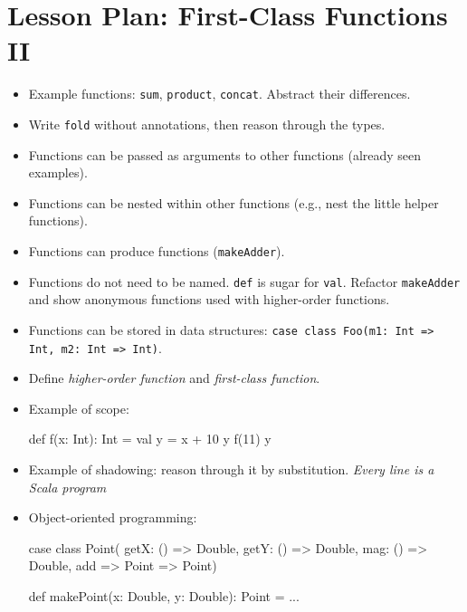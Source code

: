 \documentclass[9pt]{extbook}
\begin{document}
\chapter{Lesson Plan: First-Class Functions II}

\begin{itemize}

\item Example functions: \lstinline|sum|, \lstinline|product|, \lstinline|concat|. Abstract their differences. 

\item Write \lstinline|fold| without annotations, then reason through the types.

\item Functions can be passed as arguments to other functions (already seen examples).

\item Functions can be nested within other functions (e.g., nest the little helper functions).

\item Functions can produce functions (\lstinline|makeAdder|).

\item Functions do not need to be named. \lstinline|def| is sugar for
  \lstinline|val|. Refactor \lstinline|makeAdder| and show anonymous
  functions used with higher-order functions.

\item Functions can be stored in data structures:
  \lstinline|case class Foo(m1: Int => Int, m2: Int => Int)|.

\item Define \emph{higher-order function} and \emph{first-class function}.

\item Example of scope:

  \begin{scalacode}
  def f(x: Int): Int = {
    val y = x + 10
    y
  }
  f(11)
  y
  \end{scalacode}

\item Example of shadowing: reason through it by
  substitution. \emph{Every line is a Scala program}

\item Object-oriented programming:

\begin{scalacode}
case class Point(
  getX: () => Double,
  getY: () => Double,
  mag: () => Double,
  add => Point => Point)

def makePoint(x: Double, y: Double): Point = ...
\end{scalacode}

\end{itemize}
\end{document}
